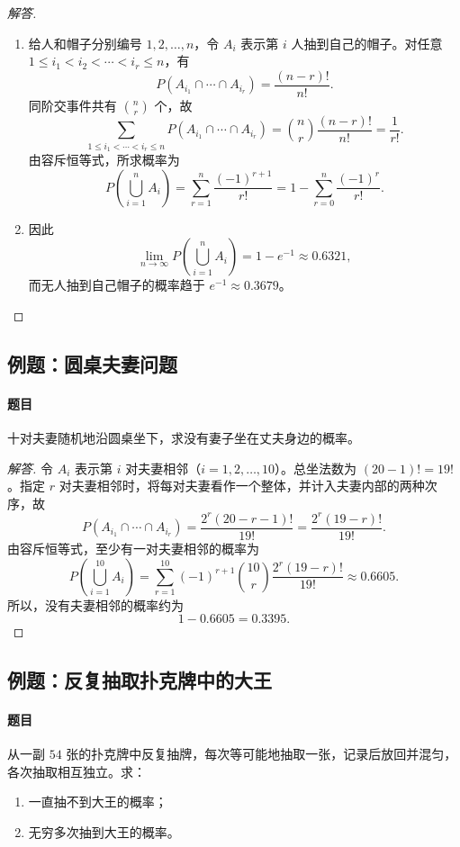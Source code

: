 \begin{proof}[解答]
\begin{enumerate}
\item 给人和帽子分别编号 $1,2,\ldots,n$，令 $A_i$ 表示第 $i$ 人抽到自己的帽子。对任意
$1\leq i_1<i_2<\cdots<i_r\leq n$，有
\[
P(A_{i_1}\cap\cdots\cap A_{i_r})=\frac{(n-r)!}{n!}.
\]
同阶交事件共有 $\binom{n}{r}$ 个，故
\[
\sum_{1\leq i_1<\cdots<i_r\leq n}
P(A_{i_1}\cap\cdots\cap A_{i_r})
=\binom{n}{r}\frac{(n-r)!}{n!}=\frac{1}{r!}.
\]
由容斥恒等式，所求概率为
\[
P\left(\bigcup_{i=1}^{n}A_i\right)
=\sum_{r=1}^{n}\frac{(-1)^{r+1}}{r!}
=1-\sum_{r=0}^{n}\frac{(-1)^r}{r!}.
\]
\item 因此
\[
\lim_{n\to\infty}P\left(\bigcup_{i=1}^{n}A_i\right)
=1-e^{-1}\approx0.6321,
\]
而无人抽到自己帽子的概率趋于 $e^{-1}\approx0.3679$。
\end{enumerate}
\end{proof}

\subsection{例题：圆桌夫妻问题}\label{note:c1:e11}
\paragraph{题目}
十对夫妻随机地沿圆桌坐下，求没有妻子坐在丈夫身边的概率。

\begin{proof}[解答]
令 $A_i$ 表示第 $i$ 对夫妻相邻（$i=1,2,\ldots,10$）。总坐法数为
$(20-1)!=19!$。指定 $r$ 对夫妻相邻时，将每对夫妻看作一个整体，并计入夫妻内部的两种次序，故
\[
P(A_{i_1}\cap\cdots\cap A_{i_r})
=\frac{2^r(20-r-1)!}{19!}
=\frac{2^r(19-r)!}{19!}.
\]
由容斥恒等式，至少有一对夫妻相邻的概率为
\[
P\left(\bigcup_{i=1}^{10}A_i\right)
=\sum_{r=1}^{10}(-1)^{r+1}\binom{10}{r}
\frac{2^r(19-r)!}{19!}
\approx0.6605.
\]
所以，没有夫妻相邻的概率约为
\[
1-0.6605=0.3395.
\]
\end{proof}

\subsection{例题：反复抽取扑克牌中的大王}\label{note:c1:e12}
\paragraph{题目}
从一副 $54$ 张的扑克牌中反复抽牌，每次等可能地抽取一张，记录后放回并混匀，各次抽取相互独立。求：
\begin{enumerate}
\item 一直抽不到大王的概率；
\item 无穷多次抽到大王的概率。
\end{enumerate}

